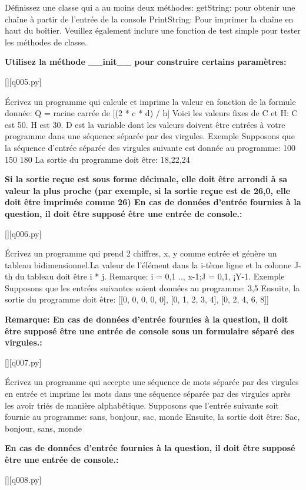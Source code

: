 \question
Définissez une classe qui a au moins deux méthodes:
getString: pour obtenir une chaîne à partir de l'entrée de la console
PrintString: Pour imprimer la chaîne en haut du boîtier.
Veuillez également inclure une fonction de test simple pour tester les méthodes de classe.
\par
\textbf{Utilisez la méthode \_\_init\_\_ pour construire certains paramètres:}
\renewcommand{\nomfichier}{q005.py}
\begin{solution}
    \pythonfile{\chemincode \nomfichier}[][q005.py]
\end{solution}


\question
Écrivez un programme qui calcule et imprime la valeur en fonction de la formule donnée:
Q = racine carrée de [(2 * c * d) / h]
Voici les valeurs fixes de C et H:
C est 50. H est 30.
D est la variable dont les valeurs doivent être entrées à votre programme dans une séquence séparée par des virgules.
Exemple
Supposons que la séquence d'entrée séparée des virgules suivante est donnée au programme:
100 150 180
La sortie du programme doit être:
18,22,24
\par
\textbf{Si la sortie reçue est sous forme décimale, elle doit être arrondi à sa valeur la plus proche (par exemple, si la sortie reçue est de 26,0, elle doit être imprimée comme 26)
En cas de données d'entrée fournies à la question, il doit être supposé être une entrée de console.:}
\renewcommand{\nomfichier}{q006.py}
\begin{solution}
    \pythonfile{\chemincode \nomfichier}[][q006.py]
\end{solution}


\question
Écrivez un programme qui prend 2 chiffres, x, y comme entrée et génère un tableau bidimensionnel.La valeur de l'élément dans la i-tème ligne et la colonne J-th du tableau doit être i * j.
Remarque: i = 0,1 .., x-1;J = 0,1, ¡Y-1.
Exemple
Supposons que les entrées suivantes soient données au programme:
3,5
Ensuite, la sortie du programme doit être:
[[0, 0, 0, 0, 0], [0, 1, 2, 3, 4], [0, 2, 4, 6, 8]]
\par
\textbf{Remarque: En cas de données d'entrée fournies à la question, il doit être supposé être une entrée de console sous un formulaire séparé des virgules.:}
\renewcommand{\nomfichier}{q007.py}
\begin{solution}
    \pythonfile{\chemincode \nomfichier}[][q007.py]
\end{solution}


\question
Écrivez un programme qui accepte une séquence de mots séparée par des virgules en entrée et imprime les mots dans une séquence séparée par des virgules après les avoir triés de manière alphabétique.
Supposons que l'entrée suivante soit fournie au programme:
sans, bonjour, sac, monde
Ensuite, la sortie doit être:
Sac, bonjour, sans, monde
\par
\textbf{En cas de données d'entrée fournies à la question, il doit être supposé être une entrée de console.:}
\renewcommand{\nomfichier}{q008.py}
\begin{solution}
    \pythonfile{\chemincode \nomfichier}[][q008.py]
\end{solution}



